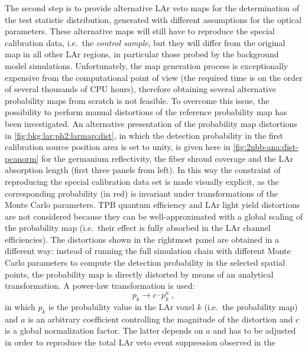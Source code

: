 \begin{description}[wide]
    \newpar
    The second step is to provide alternative LAr veto maps for the determination of the
    test statistic distribution, generated with different assumptions for the optical
    parameters. These alternative maps will still have to reproduce the special
    calibration data, i.e.~the \emph{control sample}, but they will differ from the
    original map in all other LAr regions, in particular those probed by the background
    model simulations.  Unfortunately, the map generation process is exceptionally
    expensive from the computational point of view (the required time is on the order of
    several thousands of CPU hours), therefore obtaining several alternative probability
    maps from scratch is not feasible. To overcome this issue, the possibility to perform
    manual distortions of the reference probability map has been investigated.
    \newpar
    An alternative presentation of the probability map distortions in
    \cref{fig:bkg:lar:ph2:larmap:dist}, in which the detection probability in the first
    calibration source position area is set to unity, is given here in
    \cref{fig:2nbb-ana:dist-pcanorm} for the germanium reflectivity, the fiber shroud
    coverage and the LAr absorption length (first three panels from left). In this way the
    constraint of reproducing the special calibration data set is made visually explicit,
    as the corresponding probability (in red) is invariant under transformations of the
    Monte Carlo parameters. TPB quantum efficiency and LAr light yield distortions are not
    considered because they can be well-approximated with a global scaling of the
    probability map (i.e.~their effect is fully absorbed in the LAr channel efficiencies).
    The distortions shown in the rightmost panel are obtained in a different way: instead
    of running the full simulation chain with different Monte Carlo parameters to compute
    the detection probability in the selected spatial points, the probability map is
    directly distorted by means of an analytical transformation. A power-law
    transformation is used:
    \begin{equation}\label{eq:2nbb-ana:powerlaw}
      p_k \rightarrow c \cdot p_k^a \;,
    \end{equation}
    in which $p_k$ is the probability value in the LAr voxel $k$ (i.e.~the probability
    map) and $a$ is an arbitrary coefficient controlling the magnitude of the distortion
    and $c$ is a global normalization factor. The latter depends on $a$ and has to be
    adjusted in order to reproduce the total LAr veto event suppression observed in the

\end{description}

